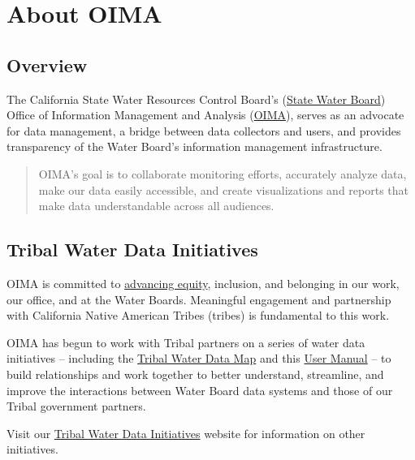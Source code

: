 \documentclass[
  letterpaper,
  DIV=11,
  numbers=noendperiod]{scrreprt}
\begin{document}

\chapter{About OIMA}\label{about-oima}

\section{Overview}\label{overview}

The California State Water Resources Control Board's
(\href{https://www.waterboards.ca.gov/}{State Water Board}) Office of
Information Management and Analysis
(\href{https://www.waterboards.ca.gov/resources/oima/}{OIMA}), serves as
an advocate for data management, a bridge between data collectors and
users, and provides transparency of the Water Board's information
management infrastructure.

\begin{quote}
OIMA's goal is to collaborate monitoring efforts, accurately analyze
data, make our data easily accessible, and create visualizations and
reports that make data understandable across all audiences.
\end{quote}

\section{Tribal Water Data
Initiatives}\label{tribal-water-data-initiatives}

OIMA is committed to
\href{https://www.waterboards.ca.gov/racial_equity/resolution-and-actions.html}{advancing
equity}, inclusion, and belonging in our work, our office, and at the
Water Boards. Meaningful engagement and partnership with California
Native American Tribes (tribes) is fundamental to this work.

OIMA has begun to work with Tribal partners on a series of water data
initiatives -- including the
\href{https://gispublic.waterboards.ca.gov/portal/home/item.html?id=a71c1841907240e1a4d896c8cf2302a8}{Tribal
Water Data Map} and this
\href{https://cawaterboarddatacenter.github.io/tribal-water-data-map-manual/}{User
Manual} -- to build relationships and work together to better
understand, streamline, and improve the interactions between Water Board
data systems and those of our Tribal government partners.

Visit our
\href{https://www.waterboards.ca.gov/resources/oima/tribal_water_data_initiatives/}{Tribal
Water Data Initiatives} website for information on other initiatives.
\end{document}
